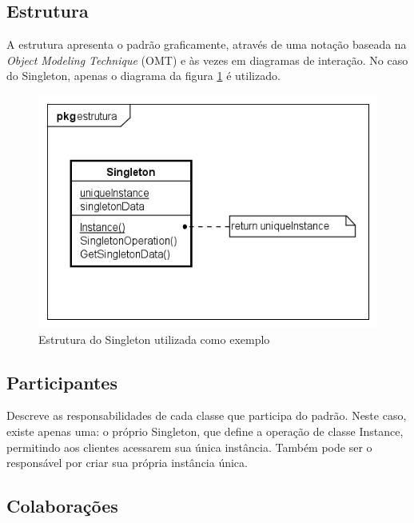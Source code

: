 \subsection*{Estrutura}

A estrutura apresenta o padrão graficamente, através de uma 
notação baseada na \textit{Object Modeling Technique} (OMT) 
e às vezes em diagramas de interação. No caso do Singleton, 
apenas o diagrama da figura \ref{fig_grafico} é utilizado.

\begin{figure}[htb]
	\caption{\label{fig_grafico}Estrutura do Singleton utilizada como exemplo}
	\begin{center}
	    \includegraphics[scale=0.6]{5_padroes-contexto-funcional/5.1_criacionais/5.1.5_singleton/singleton_estrutura.png}
    \end{center}
\end{figure}

\subsection*{Participantes}

Descreve as responsabilidades de cada classe que 
participa do padrão. Neste caso, existe 
apenas uma: o próprio Singleton, que define 
a operação de classe Instance, permitindo aos clientes 
acessarem sua única instância. Também pode ser o 
responsável por criar sua própria instância única.

\subsection*{Colaborações}

